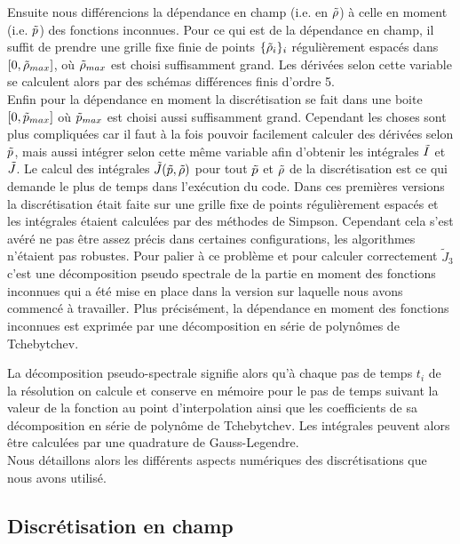 \documentclass[10.5pt]{article}
\begin{document}
\begin{multicols*}{2}
Ensuite nous différencions la dépendance en champ (i.e. en $\tilde{\rho}$) à celle en moment (i.e. $\tilde{p}$) des fonctions inconnues. Pour ce qui est de la dépendance en champ, il suffit de prendre une grille fixe finie de points $\{ \tilde{\rho}_i \}_i$ régulièrement espacés dans $[0, \tilde{\rho}_{max}]$, où $\tilde{\rho}_{max}$ est choisi suffisamment grand. Les dérivées selon cette variable se calculent alors par des schémas différences finis d'ordre 5. \\

Enfin pour la dépendance en moment la discrétisation se fait dans une boite $[0, \tilde{p}_{max}]$ où $\tilde{p}_{max}$ est choisi aussi suffisamment grand. Cependant les choses sont plus compliquées car il faut à la fois pouvoir facilement calculer des dérivées selon $\tilde{p}$, mais aussi intégrer selon cette même variable afin d'obtenir les intégrales $\tilde{I}$ et $\tilde{J}$.  Le calcul des intégrales $\tilde{J}(\tilde{p}, \tilde{\rho})$ pour tout $\tilde{p}$ et $\tilde{\rho}$ de la discrétisation est ce qui demande le plus de temps dans l'exécution du code. Dans ces premières versions la discrétisation était faite sur une grille fixe de points régulièrement espacés et les intégrales étaient calculées par des méthodes de Simpson. Cependant cela s'est avéré ne pas être assez précis dans certaines configurations, les algorithmes n'étaient pas robustes. Pour palier à ce problème et pour calculer correctement $\tilde J_3$ c'est une décomposition pseudo spectrale de la partie en moment des fonctions inconnues qui a été mise en place dans la version sur laquelle nous avons commencé à travailler. Plus précisément, la dépendance en moment des fonctions inconnues est exprimée par une décomposition en série de polynômes de Tchebytchev. 

La décomposition pseudo-spectrale signifie alors qu'à chaque pas de temps $t_i$ de la résolution on calcule et conserve en mémoire pour le pas de temps suivant la valeur de la fonction au point d'interpolation ainsi que les coefficients de sa décomposition en série de polynôme de Tchebytchev. Les intégrales peuvent alors être calculées par une quadrature de Gauss-Legendre. \\

Nous détaillons alors les différents aspects numériques des discrétisations que nous avons utilisé.




\subsection{Discrétisation en champ}


\end{multicols*}
\end{document}
